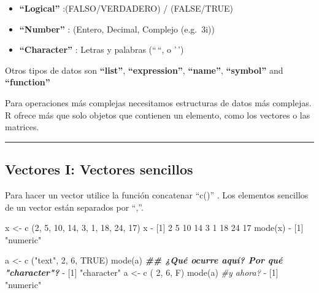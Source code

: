 \documentclass[
]{book}
\newenvironment{Shaded}{\begin{snugshade}}{\end{snugshade}}
\newcommand{\CommentTok}[1]{\textcolor[rgb]{0.56,0.35,0.01}{\textit{#1}}}
\newcommand{\ConstantTok}[1]{\textcolor[rgb]{0.00,0.00,0.00}{#1}}
\newcommand{\DecValTok}[1]{\textcolor[rgb]{0.00,0.00,0.81}{#1}}
\newcommand{\DocumentationTok}[1]{\textcolor[rgb]{0.56,0.35,0.01}{\textbf{\textit{#1}}}}
\newcommand{\FunctionTok}[1]{\textcolor[rgb]{0.00,0.00,0.00}{#1}}
\newcommand{\NormalTok}[1]{#1}
\newcommand{\OtherTok}[1]{\textcolor[rgb]{0.56,0.35,0.01}{#1}}
\newcommand{\SpecialCharTok}[1]{\textcolor[rgb]{0.00,0.00,0.00}{#1}}
\newcommand{\StringTok}[1]{\textcolor[rgb]{0.31,0.60,0.02}{#1}}
\providecommand{\tightlist}{%
  \setlength{\itemsep}{0pt}\setlength{\parskip}{0pt}}
\begin{document}
\begin{itemize}
\tightlist
\item
  \textbf{``Logical''} :(FALSO/VERDADERO) / (FALSE/TRUE)
\item
  \textbf{``Number''} : (Entero, Decimal, Complejo (e.g.~3i))
\item
  \textbf{``Character''} : Letras y palabras (``\,``, o '\,')
\end{itemize}

Otros tipos de datos son \textbf{``list''}, \textbf{``expression''}, \textbf{``name''}, \textbf{``symbol''} and \textbf{``function''}

Para operaciones más complejas necesitamos estructuras de datos más complejas. R ofrece más que solo objetos que contienen un elemento, como los vectores o las matrices.

\begin{center}\rule{0.5\linewidth}{0.5pt}\end{center}

\hypertarget{vectores-i-vectores-sencillos}{%
\subsection{Vectores I: Vectores sencillos}\label{vectores-i-vectores-sencillos}}

Para hacer un vector utilice la función concatenar ``c()'' . Los elementos sencillos de un vector están separados por ``,''.

\begin{Shaded}
\begin{Highlighting}[]
\NormalTok{x }\OtherTok{\textless{}{-}} \FunctionTok{c}\NormalTok{ (}\DecValTok{2}\NormalTok{, }\DecValTok{5}\NormalTok{, }\DecValTok{10}\NormalTok{, }\DecValTok{14}\NormalTok{, }\DecValTok{3}\NormalTok{, }\DecValTok{1}\NormalTok{, }\DecValTok{18}\NormalTok{, }\DecValTok{24}\NormalTok{, }\DecValTok{17}\NormalTok{)}
\NormalTok{x}
\SpecialCharTok{{-}}\NormalTok{ [}\DecValTok{1}\NormalTok{]  }\DecValTok{2}  \DecValTok{5} \DecValTok{10} \DecValTok{14}  \DecValTok{3}  \DecValTok{1} \DecValTok{18} \DecValTok{24} \DecValTok{17}
\FunctionTok{mode}\NormalTok{(x)}
\SpecialCharTok{{-}}\NormalTok{ [}\DecValTok{1}\NormalTok{] }\StringTok{"numeric"}
\end{Highlighting}
\end{Shaded}

\begin{Shaded}
\begin{Highlighting}[]
\NormalTok{a }\OtherTok{\textless{}{-}} \FunctionTok{c}\NormalTok{ (}\StringTok{"text"}\NormalTok{, }\DecValTok{2}\NormalTok{, }\DecValTok{6}\NormalTok{, }\ConstantTok{TRUE}\NormalTok{)}
\FunctionTok{mode}\NormalTok{(a) }\DocumentationTok{\#\# ¿Qué ocurre aquí? Por qué "character"?}
\SpecialCharTok{{-}}\NormalTok{ [}\DecValTok{1}\NormalTok{] }\StringTok{"character"}
\NormalTok{a }\OtherTok{\textless{}{-}} \FunctionTok{c}\NormalTok{ ( }\DecValTok{2}\NormalTok{, }\DecValTok{6}\NormalTok{, F)}
\FunctionTok{mode}\NormalTok{(a) }\CommentTok{\#y ahora?}
\SpecialCharTok{{-}}\NormalTok{ [}\DecValTok{1}\NormalTok{] }\StringTok{"numeric"}
\end{Highlighting}
\end{Shaded}
\end{document}
